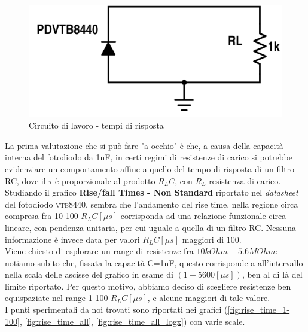 \documentclass[journal, a4paper]{IEEEtran}
\begin{document}
\begin{figure}
\centering
\includegraphics[width=0.9\linewidth]{./week06-es14}
\caption{Circuito di lavoro - tempi di risposta}
\label{fig:week06-es14}
\end{figure}


La prima valutazione che si può fare "a occhio" è che, a causa della capacità interna del fotodiodo da 1nF, in certi regimi di resistenze di carico si potrebbe evidenziare un comportamento affine a quello del tempo di risposta di un filtro RC, dove il $\tau $ è proporzionale al prodotto $R_L C$, con $R_L$ resistenza di carico.\\
Studiando il grafico \textbf{Rise/fall Times - Non Standard} riportato nel \textit{datasheet} del fotodiodo \textsc{vtb8440}, sembra che l'andamento del rise time, nella regione circa compresa fra 10-100 $R_L C [\mu s]$ corrisponda ad una relazione funzionale circa lineare, con pendenza unitaria, per cui uguale a quella di un filtro RC. Nessuna informazione è invece data per valori $R_L C [\mu s]$ maggiori di 100.\\

Viene chiesto di esplorare un range di resistenze fra $10 \si{k Ohm} - 5.6 \si{M Ohm}$: notiamo subito che, fissata la capacità C=1nF, questo corrisponde a all'intervallo nella scala delle ascisse del grafico in esame di $(1-5600 [\mu s])$, ben al di là del limite riportato. Per questo motivo, abbiamo deciso di scegliere resistenze ben equispaziate nel range 1-100 $R_L C [\mu s]$, e alcune maggiori di tale valore.\\

I punti sperimentali da noi trovati sono riportati nei grafici (\ref{fig:rise_time_1-100}, \ref{fig:rise_time_all}, \ref{fig:rise_time_all_logx}) con varie scale.\\
\end{document}
